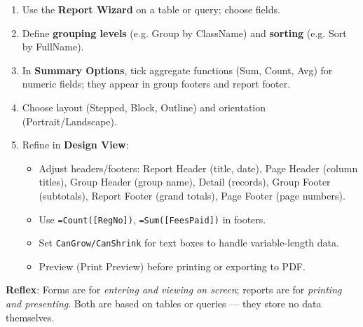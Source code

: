 \documentclass[11pt]{article}
\begin{document}
\begin{methode}
\begin{enumerate}
\item Use the \textbf{Report Wizard} on a table or query; choose fields.
\item Define \textbf{grouping levels} (e.g. Group by ClassName) and \textbf{sorting} (e.g. Sort by FullName).
\item In \textbf{Summary Options}, tick aggregate functions (Sum, Count, Avg) for numeric fields; they appear in group footers and report footer.
\item Choose layout (Stepped, Block, Outline) and orientation (Portrait/Landscape).
\item Refine in \textbf{Design View}:
\begin{itemize}
\item Adjust headers/footers: Report Header (title, date), Page Header (column titles), Group Header (group name), Detail (records), Group Footer (subtotals), Report Footer (grand totals), Page Footer (page numbers).
\item Use \texttt{=Count([RegNo])}, \texttt{=Sum([FeesPaid])} in footers.
\item Set \texttt{CanGrow/CanShrink} for text boxes to handle variable-length data.
\item Preview (Print Preview) before printing or exporting to PDF.
\end{itemize}
\end{enumerate}
\textbf{Reflex}: Forms are for \emph{entering and viewing on screen}; reports are for \emph{printing and presenting}. Both are based on tables or queries --- they store no data themselves.
\end{methode}
\end{document}
